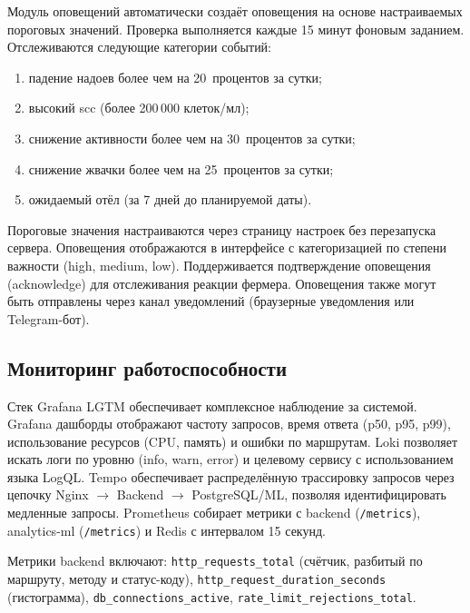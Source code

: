 Модуль оповещений автоматически создаёт оповещения на основе настраиваемых пороговых значений. Проверка выполняется каждые 15 минут фоновым заданием. Отслеживаются следующие категории событий:
\begin{enumerate}
    \item падение надоев более чем на 20~процентов за сутки;
    \item высокий \acrshort{scc} (более 200\,000 клеток/мл);
    \item снижение активности более чем на 30~процентов за сутки;
    \item снижение жвачки более чем на 25~процентов за сутки;
    \item ожидаемый отёл (за 7 дней до планируемой даты).
\end{enumerate}

Пороговые значения настраиваются через страницу настроек без перезапуска сервера. Оповещения отображаются в интерфейсе с категоризацией по степени важности (high, medium, low). Поддерживается подтверждение оповещения (acknowledge) для отслеживания реакции фермера. Оповещения также могут быть отправлены через канал уведомлений (браузерные уведомления или Telegram-бот).

\subsection{Мониторинг работоспособности}

Стек Grafana LGTM обеспечивает комплексное наблюдение за системой. Grafana дашборды отображают частоту запросов, время ответа (p50, p95, p99), использование ресурсов (CPU, память) и ошибки по маршрутам. Loki позволяет искать логи по уровню (info, warn, error) и целевому сервису с использованием языка LogQL. Tempo обеспечивает распределённую трассировку запросов через цепочку Nginx $\to$ Backend $\to$ PostgreSQL/ML, позволяя идентифицировать медленные запросы. Prometheus собирает метрики с backend (\texttt{/metrics}), analytics-ml (\texttt{/metrics}) и Redis с интервалом 15 секунд.

Метрики backend включают: \texttt{http\_requests\_total} (счётчик, разбитый по маршруту, методу и статус-коду), \texttt{http\_request\_duration\_seconds} (гистограмма), \texttt{db\_connections\_active}, \texttt{rate\_limit\_rejections\_total}.
